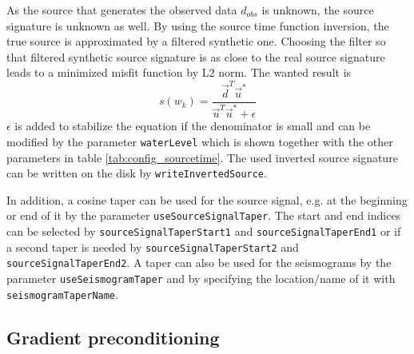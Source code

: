 \documentclass[pdftex,a4paper,parskip,listof=totoc,bibliography=totoc,onehalfspacing,12pt]{scrreprt}
\begin{document}
As the source that generates the observed data $d_{obs}$ is unknown, the source signature is unknown as well. By using the source time function inversion, the true source is approximated by a filtered synthetic one. Choosing the filter so that filtered synthetic source signature is as close to the real source signature leads to a minimized misfit function by L2 norm. The wanted result is 
\begin{equation*}
 s(w_k)=\dfrac{\vec{d}^T\vec{u}^*}{\vec{u}^T\vec{u}^*+\epsilon}
\end{equation*}
$\epsilon$ is added to stabilize the equation if the denominator is small and can be modified by the parameter \verb+waterLevel+ which is shown together with the other parameters in table \ref{tab:config_sourcetime}. The used inverted source signature can be written on the disk by \verb+writeInvertedSource+.

In addition, a cosine taper can be used for the source signal, e.g. at the beginning or end of it by the parameter \verb+useSourceSignalTaper+. The start and end indices can be selected by \verb+sourceSignalTaperStart1+ and \verb+sourceSignalTaperEnd1+ or if a second taper is needed by \verb+sourceSignalTaperStart2+ and \verb+sourceSignalTaperEnd2+.
A taper can also be used for the seismograms by the parameter \verb+useSeismogramTaper+ and by specifying the location/name of it with \verb+seismogramTaperName+.

\subsection{Gradient preconditioning}
\label{config:precond}
\end{document}

